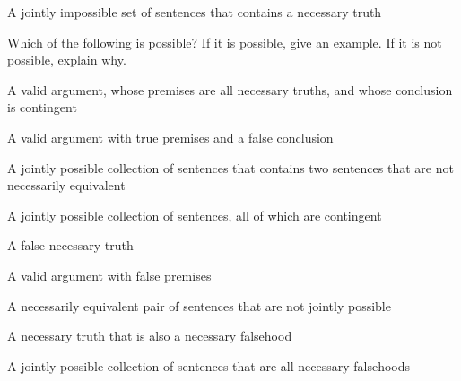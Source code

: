 \begin{practiceproblems}
\begin{earg}
\item A jointly impossible set of sentences that contains a necessary truth
\end{earg}

\problempart
Which of the following is possible? If it is possible, give an example. If it is not possible, explain why.

\begin{earg}
\item A valid argument, whose premises are all necessary truths, and whose conclusion is contingent
\item A valid argument with true premises and a false conclusion
\item A jointly possible collection of sentences that contains two sentences that are not necessarily equivalent
\item A jointly possible collection of sentences, all of which are contingent
\item A false necessary truth
\item A valid argument with false premises
\item A necessarily equivalent pair of sentences that are not jointly possible
\item A necessary truth that is also a necessary falsehood
\item A jointly possible collection of sentences that are all necessary falsehoods
\end{earg}

\end{practiceproblems}
